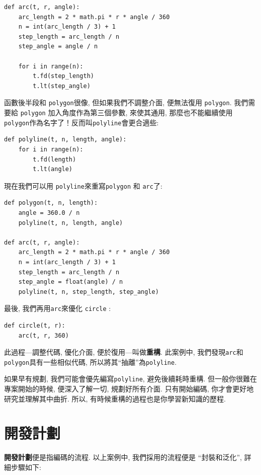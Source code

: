 \documentclass[10pt]{book}
\begin{document}
\begin{verbatim}
def arc(t, r, angle):
    arc_length = 2 * math.pi * r * angle / 360
    n = int(arc_length / 3) + 1
    step_length = arc_length / n
    step_angle = angle / n
    
    for i in range(n):
        t.fd(step_length)
        t.lt(step_angle)
\end{verbatim}
%
函數後半段和 {\tt polygon}很像, 但如果我們不調整介面, 便無法復用 {\tt polygon}. 
我們需要給 {\tt polygon} 加入角度作為第三個參數, 來使其通用, 
那麼也不能繼續使用 {\tt polygon}作為名字了！反而叫{\tt polyline}會更合適些:

\begin{verbatim}
def polyline(t, n, length, angle):
    for i in range(n):
        t.fd(length)
        t.lt(angle)
\end{verbatim}
%
現在我們可以用 {\tt polyline}來重寫{\tt polygon} 和 {\tt arc}了:

\begin{verbatim}
def polygon(t, n, length):
    angle = 360.0 / n
    polyline(t, n, length, angle)

def arc(t, r, angle):
    arc_length = 2 * math.pi * r * angle / 360
    n = int(arc_length / 3) + 1
    step_length = arc_length / n
    step_angle = float(angle) / n
    polyline(t, n, step_length, step_angle)
\end{verbatim}
%
最後, 我們再用{\tt arc}來優化 {\tt circle} :

\begin{verbatim}
def circle(t, r):
    arc(t, r, 360)
\end{verbatim}
%
此過程---調整代碼, 優化介面, 便於復用---叫做{\bf 重構}. 
此案例中, 我們發現{\tt arc}和{\tt polygon}具有一些相似代碼, 
所以將其``抽離''為{\tt polyline}.\

如果早有規劃, 我們可能會優先編寫{\tt polyline}, 避免後續耗時重構. 
但一般你很難在專案開始的時候, 便深入了解一切, 規劃好所有介面. 
只有開始編碼, 你才會更好地研究並理解其中曲折. 
所以, 有時候重構的過程也是你學習新知識的歷程. 


\section{開發計劃}

{\bf 開發計劃}便是指編碼的流程. 以上案例中, 我們採用的流程便是
``封裝和泛化'', 詳細步驟如下:
\end{document}
